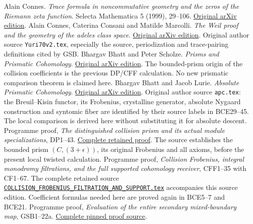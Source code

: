 
 Alain Connes.
\emph{Trace formula in noncommutative geometry and the zeros of the
Riemann zeta function}. Selecta Mathematica 5 (1999), 29--106.
\href{https://arxiv.org/abs/math/9811068v1}{Original arXiv edition}.
 Alain Connes, Caterina Consani and Matilde Marcolli.
\emph{The Weil proof and the geometry of the adeles class space}.
\href{https://arxiv.org/abs/math/0703392v1}{Original arXiv edition}.
Original author source \texttt{Yuri70v2.tex}, especially the source,
periodization and trace-pairing definitions cited by GSB.
 Bhargav Bhatt and Peter Scholze.
\emph{Prisms and Prismatic Cohomology}.
\href{https://arxiv.org/abs/1905.08229v4}{Original arXiv edition}.
The bounded-prism origin of the collision coefficients is the
previous DP/CFF calculation. No new prismatic comparison theorem
is claimed here.
 Bhargav Bhatt and Jacob Lurie.
\emph{Absolute Prismatic Cohomology}.
\href{https://arxiv.org/abs/2201.06120v1}{Original arXiv edition}.
Original author source \texttt{apc.tex}: the Breuil--Kisin
functor, its Frobenius, crystalline generator, absolute
Nygaard construction and syntomic fiber are identified by
their source labels in BCE29--45. The local comparison
is derived here without substituting it for absolute descent.
 Programme proof,
\emph{The distinguished collision prism and its actual module
specializations}, DP1--43.
\href{collision_boundary/original_sources/DISTINGUISHED_COLLISION_PRISM_DERIVATION.md}
{Complete retained proof}. The source establishes the bounded
prism \((C,(3+\epsilon))\), its original Frobenius and all
axioms, before the present local twisted calculation.
 Programme proof,
\emph{Collision Frobenius, integral monodromy filtrations, and the
full supported cohomology receiver}, CFF1--35 with CF1--67.
The complete retained source
\href{collision_boundary/original_sources/COLLISION_FROBENIUS_FILTRATION_AND_SUPPORT.tex}
{\texttt{COLLISION\_FROBENIUS\_FILTRATION\_AND\_SUPPORT.tex}}
accompanies this source edition. Coefficient formulas needed here
are proved again in BCE5--7 and BCE21.
 Programme proof,
\emph{Evaluation of the entire secondary mixed-boundary map},
GSB1--22a.
\href{https://github.com/KokunoYumeto/zeta-function-research-reader/blob/7bb431df02b42681b3c7335fbf272a3771f777ef/workbenches/splitzero-tandem/research-self-audit/supporting_proofs/GLOBAL_SECONDARY_BOUNDARY_EVALUATION.tex}
{Complete pinned proof source}.
